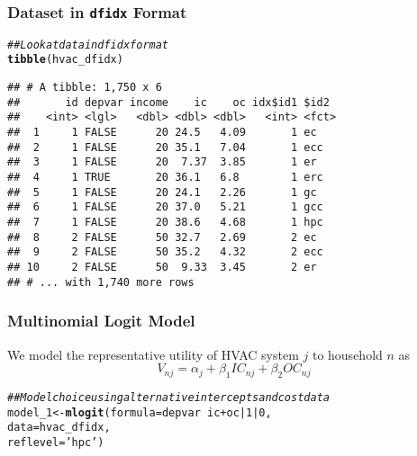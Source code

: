 \documentclass{beamer}\usepackage[]{graphicx}\usepackage[]{color}
\makeatletter
\newcommand{\hlnum}[1]{\textcolor[rgb]{0.686,0.059,0.569}{#1}}%
\newcommand{\hlstr}[1]{\textcolor[rgb]{0.192,0.494,0.8}{#1}}%
\newcommand{\hlcom}[1]{\textcolor[rgb]{0.678,0.584,0.686}{\textit{#1}}}%
\newcommand{\hlopt}[1]{\textcolor[rgb]{0,0,0}{#1}}%
\newcommand{\hlstd}[1]{\textcolor[rgb]{0.345,0.345,0.345}{#1}}%
\newcommand{\hlkwb}[1]{\textcolor[rgb]{0.69,0.353,0.396}{#1}}%
\newcommand{\hlkwc}[1]{\textcolor[rgb]{0.333,0.667,0.333}{#1}}%
\newcommand{\hlkwd}[1]{\textcolor[rgb]{0.737,0.353,0.396}{\textbf{#1}}}%
\newenvironment{kframe}{%
 \def\at@end@of@kframe{}%
 \ifinner\ifhmode%
  \def\at@end@of@kframe{\end{minipage}}%
  \begin{minipage}{\columnwidth}%
 \fi\fi%
 \def\FrameCommand##1{\hskip\@totalleftmargin \hskip-\fboxsep
 \colorbox{shadecolor}{##1}\hskip-\fboxsep
     \hskip-\linewidth \hskip-\@totalleftmargin \hskip\columnwidth}%
 \MakeFramed {\advance\hsize-\width
   \@totalleftmargin\z@ \linewidth\hsize
   \@setminipage}}%
 {\par\unskip\endMakeFramed%
 \at@end@of@kframe}
\newenvironment{knitrout}{}{} %
\makeatother
\begin{document}
\begin{frame}[fragile]\frametitle{Dataset in \texttt{dfidx} Format}
\begin{knitrout}\footnotesize
{}\color{fgcolor}\begin{kframe}
\begin{alltt}
\hlcom{## Look at data in dfidx format}
\hlkwd{tibble}\hlstd{(hvac_dfidx)}
\end{alltt}
\begin{verbatim}
## # A tibble: 1,750 x 6
##       id depvar income    ic    oc idx$id1 $id2 
##    <int> <lgl>   <dbl> <dbl> <dbl>   <int> <fct>
##  1     1 FALSE      20 24.5   4.09       1 ec   
##  2     1 FALSE      20 35.1   7.04       1 ecc  
##  3     1 FALSE      20  7.37  3.85       1 er   
##  4     1 TRUE       20 36.1   6.8        1 erc  
##  5     1 FALSE      20 24.1   2.26       1 gc   
##  6     1 FALSE      20 37.0   5.21       1 gcc  
##  7     1 FALSE      20 38.6   4.68       1 hpc  
##  8     2 FALSE      50 32.7   2.69       2 ec   
##  9     2 FALSE      50 35.2   4.32       2 ecc  
## 10     2 FALSE      50  9.33  3.45       2 er   
## # ... with 1,740 more rows
\end{verbatim}
\end{kframe}
\end{knitrout}
\end{frame}

\begin{frame}[fragile]\frametitle{Multinomial Logit Model}
    We model the representative utility of HVAC system $j$ to household $n$ as
    $$V_{nj} = \alpha_j + \beta_1 IC_{nj} + \beta_2 OC_{nj}$$
\begin{knitrout}\footnotesize
{}\color{fgcolor}\begin{kframe}
\begin{alltt}
\hlcom{## Model choice using alternative intercepts and cost data}
\hlstd{model_1} \hlkwb{<-} \hlkwd{mlogit}\hlstd{(}\hlkwc{formula} \hlstd{= depvar} \hlopt{~} \hlstd{ic} \hlopt{+} \hlstd{oc} \hlopt{|} \hlnum{1} \hlopt{|} \hlnum{0}\hlstd{,}
                  \hlkwc{data} \hlstd{= hvac_dfidx,}
                  \hlkwc{reflevel} \hlstd{=} \hlstr{'hpc'}\hlstd{)}
\end{alltt}
\end{kframe}
\end{knitrout}
\end{frame}
\end{document}
